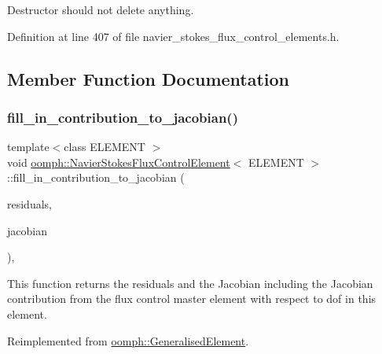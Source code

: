 Destructor should not delete anything. 



Definition at line 407 of file navier\+\_\+stokes\+\_\+flux\+\_\+control\+\_\+elements.\+h.



\subsection{Member Function Documentation}
\mbox{\label{classoomph_1_1NavierStokesFluxControlElement_a6a745b0b8b1417b7f61782e959c31f69}} 
\subsubsection{\texorpdfstring{fill\+\_\+in\+\_\+contribution\+\_\+to\+\_\+jacobian()}{fill\_in\_contribution\_to\_jacobian()}}
{\footnotesize\ttfamily template$<$class E\+L\+E\+M\+E\+NT $>$ \\
void \hyperlink{classoomph_1_1NavierStokesFluxControlElement}{oomph\+::\+Navier\+Stokes\+Flux\+Control\+Element}$<$ E\+L\+E\+M\+E\+NT $>$\+::fill\+\_\+in\+\_\+contribution\+\_\+to\+\_\+jacobian (\begin{DoxyParamCaption}\item[{\hyperlink{classoomph_1_1Vector}{Vector}$<$ double $>$ \&}]{residuals,  }\item[{\hyperlink{classoomph_1_1DenseMatrix}{Dense\+Matrix}$<$ double $>$ \&}]{jacobian }\end{DoxyParamCaption})\hspace{0.3cm}{\ttfamily [inline]}, {\ttfamily [virtual]}}



This function returns the residuals and the Jacobian including the Jacobian contribution from the flux control master element with respect to dof in this element. 



Reimplemented from \hyperlink{classoomph_1_1GeneralisedElement_a6ae09fc0d68e4309ac1b03583d252845}{oomph\+::\+Generalised\+Element}.



